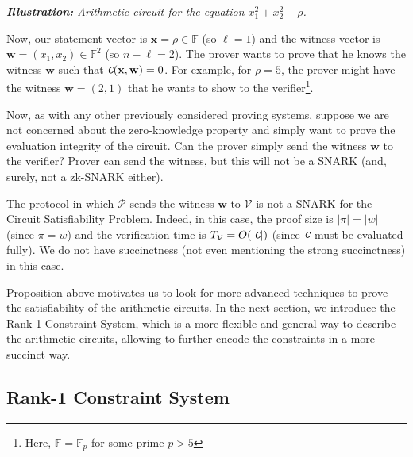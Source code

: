 \documentclass[../lecture-notes.tex]{subfiles}
\begin{document}
\begin{example}
\begin{center}

        \scriptsize \textit{\textbf{Illustration:} Arithmetic circuit for the equation $x_1^2 + x_2^2 - \rho$.}
    \end{center}

    Now, our statement vector is $\mathbf{x} = \rho \in \mathbb{F}$ (so $\ell=1$) and the witness vector is $\mathbf{w} = (x_1,x_2) \in \mathbb{F}^2$ (so $n-\ell=2$). The prover wants to prove that he knows the witness $\mathbf{w}$ such that $\textit{\texttt{C}}(\mathbf{x},\mathbf{w}) = 0$. For example, for $\rho=5$, the prover might have the witness $\mathbf{w} = (2,1)$ that he wants to show to the verifier\footnote{Here, $\mathbb{F} = \mathbb{F}_p$ for some prime $p > 5$}.
\end{example}

Now, as with any other previously considered proving systems, suppose we are not concerned about the zero-knowledge property and simply want to prove the evaluation integrity of the circuit. Can the prover simply send the witness $\mathbf{w}$ to the verifier? Prover can send the witness, but this will not be a SNARK (and, surely, not a zk-SNARK either). 

\begin{proposition}
    The protocol in which $\mathcal{P}$ sends the witness $\mathbf{w}$ to $\mathcal{V}$ is not a SNARK for the Circuit Satisfiability Problem. Indeed, in this case, the proof size is $|\pi| = |w|$ (since $\pi=w$) and the verification time is $T_{\mathcal{V}} = O(|\textit{\texttt{C}}|)$ (since $\textit{\texttt{C}}$ must be evaluated fully). We do not have succinctness (not even mentioning the strong succinctness) in this case.
\end{proposition}

Proposition above motivates us to look for more advanced techniques to prove the satisfiability of the arithmetic circuits. In the next section, we introduce the Rank-1 Constraint System, which is a more flexible and general way to describe the arithmetic circuits, allowing to further encode the constraints in a more succinct way.

\subsection{Rank-1 Constraint System}
\end{document}
